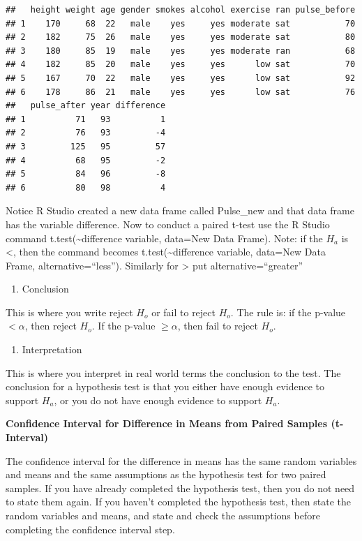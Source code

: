 \documentclass[]{book}
\providecommand{\tightlist}{%
  \setlength{\itemsep}{0pt}\setlength{\parskip}{0pt}}
\begin{document}
\begin{verbatim}
##   height weight age gender smokes alcohol exercise ran pulse_before
## 1    170     68  22   male    yes     yes moderate sat           70
## 2    182     75  26   male    yes     yes moderate sat           80
## 3    180     85  19   male    yes     yes moderate ran           68
## 4    182     85  20   male    yes     yes      low sat           70
## 5    167     70  22   male    yes     yes      low sat           92
## 6    178     86  21   male    yes     yes      low sat           76
##   pulse_after year difference
## 1          71   93          1
## 2          76   93         -4
## 3         125   95         57
## 4          68   95         -2
## 5          84   96         -8
## 6          80   98          4
\end{verbatim}

Notice R Studio created a new data frame called Pulse\_new and that data frame has the variable difference.
Now to conduct a paired t-test use the R Studio command t.test(\textasciitilde{}difference variable, data=New Data Frame). Note: if the \(H_a\) is \textless{}, then the command becomes t.test(\textasciitilde{}difference variable, data=New Data Frame, alternative=``less''). Similarly for \textgreater{} put alternative=``greater''

\begin{enumerate}
\def\labelenumi{\arabic{enumi}.}
\setcounter{enumi}{4}
\tightlist
\item
  Conclusion
\end{enumerate}

This is where you write reject \(H_o\) or fail to reject \(H_o\). The rule is: if the p-value \(<\alpha\), then reject \(H_o\). If the p-value \(\ge\alpha\), then fail to reject \(H_o\).

\begin{enumerate}
\def\labelenumi{\arabic{enumi}.}
\setcounter{enumi}{5}
\tightlist
\item
  Interpretation
\end{enumerate}

This is where you interpret in real world terms the conclusion to the test. The conclusion for a hypothesis test is that you either have enough evidence to support \(H_a\), or you do not have enough evidence to support \(H_a\).

\textbf{Confidence Interval for Difference in Means from Paired Samples (t-Interval)}

The confidence interval for the difference in means has the same random variables and means and the same assumptions as the hypothesis test for two paired samples. If you have already completed the hypothesis test, then you do not need to state them again. If you haven't completed the hypothesis test, then state the random variables and means, and state and check the assumptions before completing the confidence interval step.
\end{document}

